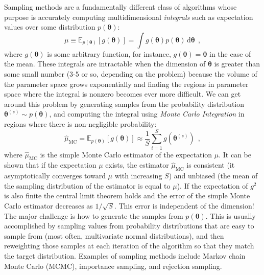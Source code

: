 \documentclass[12pt,dvipsnames]{report}
\newcommand{\ud}{\,\mathrm{d}}
\renewcommand{\vec}[1]{\boldsymbol{\mathbf{#1}}}
\newcommand{\hquad}{~~}
\begin{document}
Sampling methods are a fundamentally different class of algorithms whose
purpose is accurately computing multidimensional \emph{integrals} such as expectation 
values over some distribution $p(\vec{\theta})$:
\begin{equation}
    \mu\equiv \mathbb{E}_{p(\vec \theta)}[g(\vec \theta)]=\int g(\vec \theta) p(\vec \theta) \ud \vec \theta
    \hquad,
    \label{eq:general_expectation}
\end{equation}
where $g(\vec \theta)$ is some arbitrary function, for instance, $g(\vec \theta)=\vec \theta$
in the case of the mean.
These integrals are intractable when the dimension of $\vec{\theta}$ is greater than
some small number (3-5 or so, depending on the problem)
because  the volume of the parameter space grows exponentially and finding
the regions in parameter space where the integral is nonzero becomes ever more difficult.
We can get around this problem by generating samples from the probability distribution
$\vec{\theta}^{(s)}\sim p(\vec{\theta})$, and computing the integral using
\emph{Monte Carlo Integration} in regions where there is non-negligible probability:
\begin{equation}
    \hat{\mu}_\mathrm{MC}=\mathbb{E}_{p(\vec \theta)}[g(\vec \theta)] \approx \frac{1}{S} \sum_{i=1}^{S} g\left(\vec \theta^{(s)}\right)
    \hquad,
    \label{eq:monte_carlo_estimator}
\end{equation}
where $\hat{\mu}_\mathrm{MC}$ is the simple Monte Carlo estimator of the expectation
$\mu$.
It can be shown that if the expectation $\mu$ exists, the estimator
$\hat{\mu}_\mathrm{MC}$ is consistent (it asymptotically converges toward $\mu$ with
increasing $S$) and unbiased (the mean of the sampling distribution of the estimator
is equal to $\mu$). If the expectation of $g^2$ is also finite the central limit
theorem holds and the error of the simple  Monte Carlo estimator decreases as
$1/\sqrt{S}$. This error is independent of the dimension!
The major challenge is how to generate the samples from $p(\vec{\theta})$. This
is usually accomplished by 
sampling values from probability distributions that are easy to sample from
(most often, multivariate normal distributions), and then reweighting those
samples at each iteration of the algorithm so that they match the target
distribution. Examples of sampling methods include Markov chain Monte Carlo
(MCMC), importance sampling, and rejection sampling.
\end{document}
